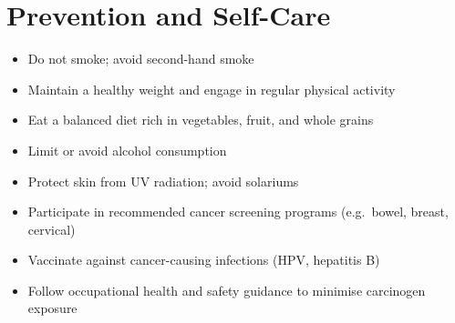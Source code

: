 \section*{Prevention and Self-Care}
\begin{itemize}
    \item Do not smoke; avoid second-hand smoke
    \item Maintain a healthy weight and engage in regular physical activity
    \item Eat a balanced diet rich in vegetables, fruit, and whole grains
    \item Limit or avoid alcohol consumption
    \item Protect skin from UV radiation; avoid solariums
    \item Participate in recommended cancer screening programs (e.g.\ bowel, breast, cervical)
    \item Vaccinate against cancer-causing infections (HPV, hepatitis B)
    \item Follow occupational health and safety guidance to minimise carcinogen exposure
\end{itemize}
